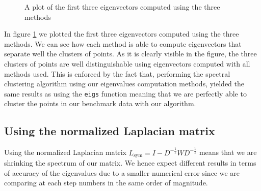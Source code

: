 \begin{figure}[H]
    \caption{A plot of the first three eigenvectors computed using the three methods}
    \label{Eigenvectors_comp}
\end{figure}
In figure \ref{Eigenvectors_comp} we plotted the first three eigenvectors computed using the three methods. We can see how each method is able to compute eigenvectors that separate well the clusters of points. As it is clearly visible in the figure, the three clusters of points are well distinguishable using eigenvectors computed with all methods used. This is enforced by the fact that, performing the spectral clustering algorithm using our eigenvalues computation methods, yielded the same results as using the \texttt{eigs} function meaning that we are perfectly able to cluster the points in our benchmark data with our algorithm.


\subsection*{Using the normalized Laplacian matrix}
Using the normalized Laplacian matrix \(L_{\text{sym}} = I - D^{-\frac{1}{2}}WD^{-\frac{1}{2}}\) means that we are shrinking the spectrum of our matrix. We hence expect different results in terms of accuracy of the eigenvalues due to a smaller numerical error since we are comparing at each step numbers in the same order of magnitude.

